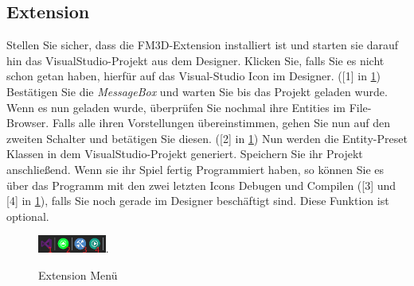 \subsection{Extension}
Stellen Sie sicher, dass die FM3D-Extension installiert ist und starten sie darauf hin das VisualStudio-Projekt aus dem Designer. Klicken Sie, falls Sie es nicht schon getan haben, hierfür auf das Visual-Studio Icon im Designer. ([1] in \cref{extmen})
Bestätigen Sie die \textit{MessageBox} und warten Sie bis das Projekt geladen wurde.
Wenn es nun geladen wurde, überprüfen Sie nochmal ihre Entities im File-Browser. Falls alle ihren Vorstellungen übereinstimmen, gehen Sie nun auf den zweiten Schalter und betätigen Sie diesen. ([2] in \cref{extmen})
Nun werden die Entity-Preset Klassen in dem VisualStudio-Projekt generiert. Speichern Sie ihr Projekt anschließend.
Wenn sie ihr Spiel fertig Programmiert haben, so können Sie es über das Programm mit den zwei letzten Icons Debugen und Compilen ([3] und [4] in \cref{extmen}), falls Sie noch gerade im Designer beschäftigt sind. Diese Funktion ist optional.
\begin{figure}
	\begin{center}
		\includegraphics[width=0.2\textwidth]{04verwendung/Designer/02ExtensionMenu.PNG}.
		\caption{Extension Menü}\label{extmen}
	\end{center}
\end{figure}